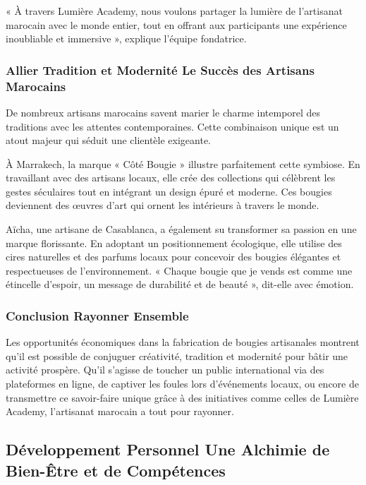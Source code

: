 \documentclass[11pt,fleqn,onecolumn,oneside]{book}
\begin{document}
\begin{remark}
« À travers Lumière Academy, nous voulons partager la lumière de l’artisanat marocain avec le monde entier, tout en offrant aux participants une expérience inoubliable et immersive », explique l’équipe fondatrice.
\end{remark}

\subsubsection*{Allier Tradition et Modernité Le Succès des Artisans Marocains}

De nombreux artisans marocains savent marier le charme intemporel des traditions avec les attentes contemporaines. Cette combinaison unique est un atout majeur qui séduit une clientèle exigeante.

\begin{example}
À Marrakech, la marque « Côté Bougie » illustre parfaitement cette symbiose. En travaillant avec des artisans locaux, elle crée des collections qui célèbrent les gestes séculaires tout en intégrant un design épuré et moderne. Ces bougies deviennent des œuvres d’art qui ornent les intérieurs à travers le monde.
\end{example}

Aïcha, une artisane de Casablanca, a également su transformer sa passion en une marque florissante. En adoptant un positionnement écologique, elle utilise des cires naturelles et des parfums locaux pour concevoir des bougies élégantes et respectueuses de l’environnement. « Chaque bougie que je vends est comme une étincelle d’espoir, un message de durabilité et de beauté », dit-elle avec émotion.

\subsubsection*{Conclusion Rayonner Ensemble}

Les opportunités économiques dans la fabrication de bougies artisanales montrent qu’il est possible de conjuguer créativité, tradition et modernité pour bâtir une activité prospère. Qu’il s’agisse de toucher un public international via des plateformes en ligne, de captiver les foules lors d’événements locaux, ou encore de transmettre ce savoir-faire unique grâce à des initiatives comme celles de Lumière Academy, l’artisanat marocain a tout pour rayonner.


\subsection*{Développement Personnel Une Alchimie de Bien-Être et de Compétences}
\end{document}
